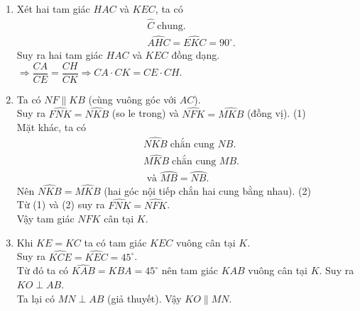 \begin{bt}
{\begin{enumerate}
	\item Xét hai tam giác $HAC$ và $KEC$, ta có
		\begin{align*}
		&\widehat{C}\;\text{chung.}\\
		&\widehat{AHC}=\widehat{EKC}=90^{\circ}.
		\end{align*}
		Suy ra hai tam giác $HAC$ và $KEC$ đồng dạng.\\
		$\Rightarrow \dfrac{CA}{CE}=\dfrac{CH}{CK} \Rightarrow CA\cdot CK=CE\cdot CH$.
		\item Ta có $NF \parallel KB$ (cùng vuông góc với $AC$). \\
		Suy ra $\widehat{FNK}=\widehat{NKB}$ (so le trong) và $\widehat{NFK}=\widehat{MKB}$ (đồng vị). \hfill (1)\\
		Mặt khác, ta có
		\begin{align*}
		&\widehat{NKB} \; \text{chắn cung } NB.\\
		&\widehat{MKB} \; \text{chắn cung } MB.\\
		&\text{ và }  \wideparen{MB}=\wideparen{NB}.
		\end{align*}
		Nên $\widehat{NKB}=\widehat{MKB}$ (hai góc nội tiếp chắn hai cung bằng nhau). \hfill (2)\\
		Từ (1) và (2) suy ra $\widehat{FNK}=\widehat{NFK}$.\\
		Vậy tam giác $NFK$ cân tại $K$.
		\item Khi $KE=KC$ ta có tam giác $KEC$ vuông cân tại $K$. \\
		Suy ra $\widehat{KCE}=\widehat{KEC}=45^{\circ}$.\\
		Từ đó ta có $\widehat{KAB}=\widehat{KBA}=45^{\circ}$ nên tam giác $KAB$ vuông cân tại $K$. Suy ra $KO\perp AB$.\\
		Ta lại có $MN\perp AB$ (giả thuyết). Vậy $KO \parallel MN$.
	\end{enumerate}	

	}
\end{bt}



